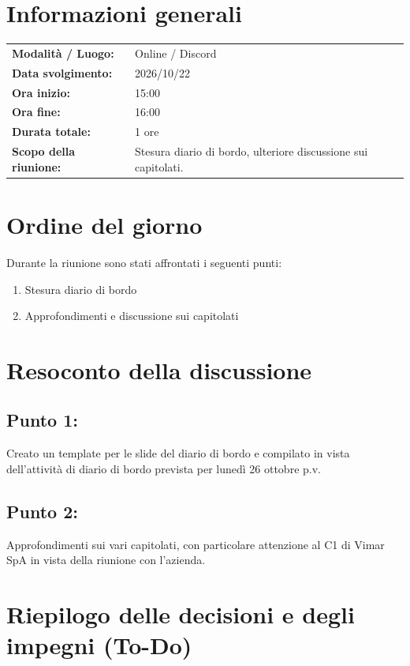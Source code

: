 \documentclass[a4paper, 11pt]{article}
\begin{document}
\newpage
\tableofcontents
\newpage


\section{Informazioni generali}
\begin{tabularx}{\textwidth}{l X}
    \textbf{Modalità / Luogo:} & Online / Discord \\
    \textbf{Data svolgimento:} & 2026/10/22 \\
    \textbf{Ora inizio:} & 15:00 \\
    \textbf{Ora fine:} & 16:00 \\
    \textbf{Durata totale:} & 1 ore \\
    \textbf{Scopo della riunione:} & Stesura diario di bordo, ulteriore discussione sui capitolati. \\
\end{tabularx}

\newpage


\section{Ordine del giorno}
Durante la riunione sono stati affrontati i seguenti punti:
\begin{enumerate}
    \item Stesura diario di bordo
    \item Approfondimenti e discussione sui capitolati
\end{enumerate}

\newpage


\section{Resoconto della discussione}

\subsection{Punto 1:}
Creato un template per le slide del diario di bordo e compilato in vista dell'attività di diario di bordo prevista per lunedì 26 ottobre p.v.
\subsection{Punto 2:}
Approfondimenti sui vari capitolati, con particolare attenzione al C1 di Vimar SpA in vista della riunione con l'azienda.
\newpage


\section{Riepilogo delle decisioni e degli impegni (To-Do)}
\end{document}
